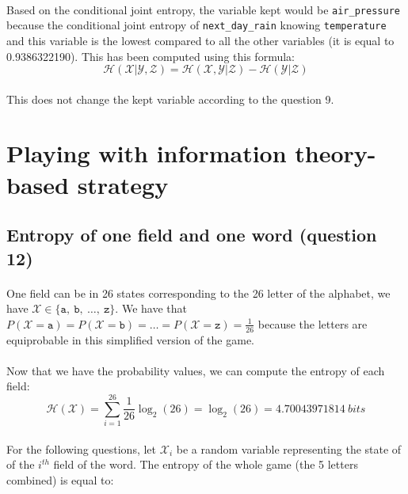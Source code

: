 \documentclass[a4paper, 11pt, oneside]{article}
\begin{document}
\paragraph{}Based on the conditional joint entropy, the variable kept would be \texttt{air\_pressure} because the conditional joint entropy of \texttt{next\_day\_rain} knowing \texttt{temperature} and this variable is the lowest compared to all the other variables (it is equal to 0.9386322190). This has been computed using this formula: 
$$\mathcal{H}(\mathcal{X} | \mathcal{Y}, \mathcal{Z}) = \mathcal{H}(\mathcal{X}, \mathcal{Y} | \mathcal{Z}) - \mathcal{H}(\mathcal{Y} | \mathcal{Z})$$

\paragraph{}This does not change the kept variable according to the question 9.

\section{Playing with information theory-based strategy}

\subsection{Entropy of one field and one word (question 12)}

\paragraph{}One field can be in 26 states corresponding to the 26 letter of the alphabet, we have $\mathcal{X} \in \{\texttt{a}, \ \texttt{b}, \ \ldots , \ \texttt{z}\}$.
We have that $P(\mathcal{X} = \texttt{a}) = P(\mathcal{X} = \texttt{b}) = \ldots = P(\mathcal{X} = \texttt{z}) =\frac{1}{26}$ because the letters are equiprobable in this simplified version of the game.

\paragraph{}Now that we have the probability values, we can compute the entropy of each field:
$$\mathcal{H}(\mathcal{X}) = \sum_{i=1}^{26} \frac{1}{26} \log_2{(26)} = \log_2{(26)} = 4.70043971814 \ bits$$

\paragraph{}For the following questions, let $\mathcal{X}_i$ be a random variable representing the state of of the $i^{th}$ field of the word. The entropy of the whole game (the 5 letters combined) is equal to:
\end{document}
